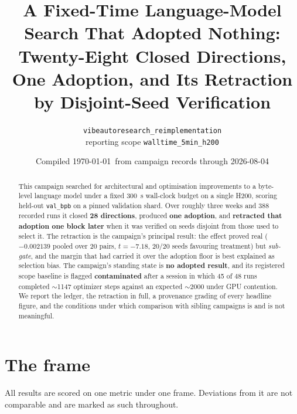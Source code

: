 \documentclass[11pt,a4paper]{article}
\title{\bfseries A Fixed-Time Language-Model Search That Adopted Nothing:\\
\large Twenty-Eight Closed Directions, One Adoption, and Its Retraction by
Disjoint-Seed Verification}
\author{\texttt{vibeautoresearch\_reimplementation}\\[2pt]
\small reporting scope \texttt{walltime\_5min\_h200}}
\date{Compiled \today\ from campaign records through 2026-08-04}
\newcommand{\bpb}{\texttt{val\_bpb}}
\begin{document}
\maketitle

\begin{abstract}
\noindent
This campaign searched for architectural and optimisation improvements to a byte-level
language model under a fixed \SI{300}{\second} wall-clock budget on a single H200, scoring
held-out \bpb{} on a pinned validation shard. Over roughly three weeks and 388 recorded runs
it closed \textbf{28 directions}, produced \textbf{one adoption}, and \textbf{retracted that
adoption one block later} when it was verified on seeds disjoint from those used to select
it. The retraction is the campaign's principal result: the effect proved real
($-0.002139$ pooled over 20 pairs, $t=-7.18$, 20/20 seeds favouring treatment) but
\emph{sub-gate}, and the margin that had carried it over the adoption floor is best
explained as selection bias. The campaign's standing state is \textbf{no adopted result},
and its registered scope baseline is flagged \textbf{contaminated} after a session in which
45 of 48 runs completed $\sim$1147 optimizer steps against an expected $\sim$2000 under GPU
contention. We report the ledger, the retraction in full, a provenance grading of every
headline figure, and the conditions under which comparison with sibling campaigns is and is
not meaningful.
\end{abstract}

\section{The frame}

All results are scored on one metric under one frame. Deviations from it are not comparable
and are marked as such throughout.
\end{document}
